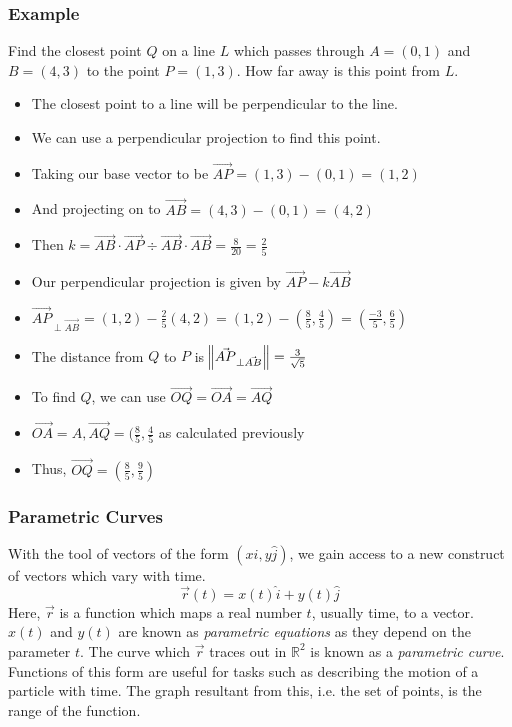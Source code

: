 \documentclass[12pt]{report}
\newcommand{\R}{\mathbb{R}}
\begin{document}
\begin{flushleft}
\subsubsection*{Example}
Find the closest point \(Q\) on a line \(L\) which passes through 
\(A = (0, 1)\) and \(B = (4, 3)\) to the point \(P = (1, 3)\). How far away
is this point from \(L\).
\begin{itemize}
    \item The closest point to a line will be perpendicular to the line.
    \item We can use a perpendicular projection to find this point.
    \item Taking our base vector to be \(\vec{AP} = (1, 3) - (0, 1) = (1, 2)\)
    \item And projecting on to \(\vec{AB} = (4, 3) - (0, 1) = (4, 2)\)
    \item Then \(k = \vec{AB}\cdot\vec{AP} \div \vec{AB}\cdot\vec{AB}
    = \frac{8}{20} = \frac{2}{5}\)
    \item Our perpendicular projection is given by \(\vec{AP} - k\vec{AB}\)
    \item \(\vec{AP}_{\perp\vec{AB}} = (1, 2) - \frac{2}{5}(4, 2) = (1, 2) - 
    (\frac{8}{5}, \frac{4}{5}) = (\frac{-3}{5}, \frac{6}{5})\)
    \item The distance from \(Q\) to \(P\) is 
    \(\norm{\vec{AP}_{\perp\vec{AB}}} = \frac{3}{\sqrt{5}}\)
    \item To find \(Q\), we can use \(\vec{OQ} = \vec{OA} = \vec{AQ}\)
    \item \(\vec{OA} = A, \vec{AQ} = (\frac{8}{5}, \frac{4}{5}\) as 
    calculated previously
    \item Thus, \(\vec{OQ} = (\frac{8}{5}, \frac{9}{5})\)
\end{itemize}

\subsubsection*{Parametric Curves}
With the tool of vectors of the form \((x\hat{i}, y\hat{j})\), we gain access
to a new construct of vectors which vary with time.
\[\vec{r}(t) = x(t)\hat{i} + y(t)\hat{j}\]
Here, \(\vec{r}\) is a function which maps a real number \(t\), usually time, 
to a vector. \(x(t)\) and \(y(t)\) are known as \textit{parametric equations} 
as they depend on the parameter \(t\). The curve which \(\vec{r}\) traces
out in \(\R^2\) is known as a \textit{parametric curve}. Functions of this form
are useful for tasks such as describing the motion of a particle with time. The
graph resultant from this, i.e. the set of points, is the range of the 
function.


\end{flushleft}
\end{document}
